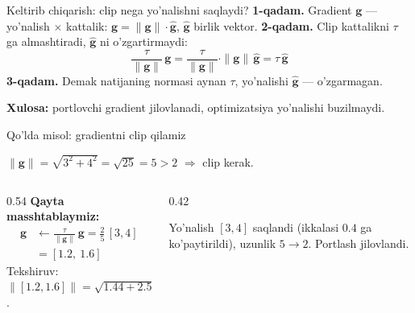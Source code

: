 \documentclass[aspectratio=169,11pt]{beamer}
\begin{document}
\begin{frame}{Keltirib chiqarish: clip nega yo'nalishni saqlaydi?}
  \textbf{1-qadam.} Gradient $\mathbf{g}$ --- yo'nalish $\times$ kattalik:
  $\mathbf{g}=\|\mathbf{g}\|\cdot\hat{\mathbf{g}}$, $\hat{\mathbf{g}}$ birlik vektor.
  \pause
  \textbf{2-qadam.} Clip kattalikni $\tau$ ga almashtiradi, $\hat{\mathbf{g}}$ ni
  o'zgartirmaydi:
  $$ \frac{\tau}{\|\mathbf{g}\|}\,\mathbf{g}
     = \frac{\tau}{\|\mathbf{g}\|}\cdot\|\mathbf{g}\|\,\hat{\mathbf{g}}
     = \tau\,\hat{\mathbf{g}} $$
  \pause
  \textbf{3-qadam.} Demak natijaning normasi aynan $\tau$, yo'nalishi $\hat{\mathbf{g}}$
  --- o'zgarmagan.
  \begin{tcolorbox}[okbox,top=2pt,bottom=2pt]
    \small \textbf{Xulosa:} portlovchi gradient jilovlanadi, optimizatsiya yo'nalishi
    buzilmaydi.
  \end{tcolorbox}
\end{frame}

\begin{frame}{Qo'lda misol: gradientni clip qilamiz}
  \begin{tcolorbox}[defbox,title={Gradient $g=[3,4]$, chegara $\tau=2$}]
    \small $\|\mathbf{g}\| = \sqrt{3^2+4^2} = \sqrt{25} = 5 > 2$ $\Rightarrow$ clip kerak.
  \end{tcolorbox}
  \vspace{0.2em}
  \begin{columns}[T]
    \begin{column}{0.54\textwidth}
      \textbf{Qayta masshtablaymiz:}
      \begin{align*}
        \mathbf{g} &\leftarrow \frac{\tau}{\|\mathbf{g}\|}\,\mathbf{g}
          = \frac{2}{5}\,[3,4]\\
          &= [1.2,\ 1.6]
      \end{align*}
      Tekshiruv: $\|[1.2,1.6]\| = \sqrt{1.44+2.56} = \sqrt{4} = \mathbf{2}$.
    \end{column}
    \begin{column}{0.42\textwidth}
      \begin{tcolorbox}[okbox,top=2pt,bottom=2pt]
        \footnotesize
        Yo'nalish $[3,4]$ saqlandi (ikkalasi $0.4$ ga ko'paytirildi), uzunlik $5\to 2$.
        Portlash jilovlandi.
      \end{tcolorbox}
    \end{column}
  \end{columns}
\end{frame}
\end{document}
